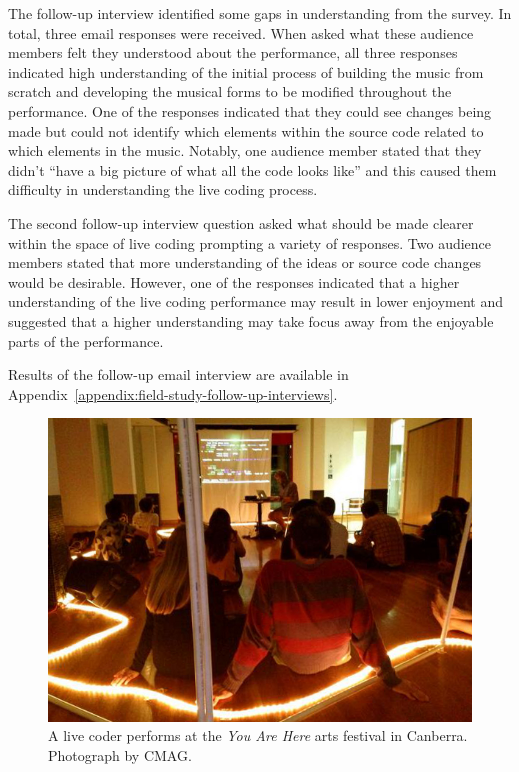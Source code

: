 The follow-up interview identified some gaps in understanding from the survey. In total, three email responses were received. When asked what these audience members felt they understood about the performance, all three responses indicated high understanding of the initial process of building the music from scratch and developing the musical forms to be modified throughout the performance. One of the responses indicated that they could see changes being made but could not identify which elements within the source code related to which elements in the music. Notably, one audience member stated that they didn't ``have a big picture of what all the code looks like'' and this caused them difficulty in understanding the live coding process. 

The second follow-up interview question asked what should be made clearer within the space of live coding prompting a variety of responses. Two audience members stated that more understanding of the ideas or source code changes would be desirable. However, one of the responses indicated that a higher understanding of the live coding performance may result in lower enjoyment and suggested that a higher understanding may take focus away from the enjoyable parts of the performance. 

Results of the follow-up email interview are available in Appendix~\ref{appendix:field-study-follow-up-interviews}.

\begin{figure}
\centering
\includegraphics[width=\textwidth]{../images/study-1-you-are-here.jpg}
\caption[A live coder performs at the \textit{You Are Here} arts festival]{A live coder performs at the \textit{You Are Here} arts festival in Canberra. Photograph by CMAG.}
\label{fig:you-are-here-performance}
\end{figure}

